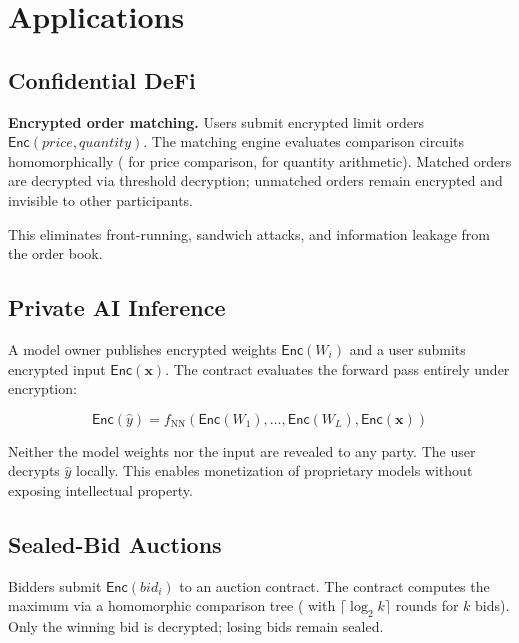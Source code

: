 \section{Applications}

\label{sec:apps}

\subsection{Confidential DeFi}

\textbf{Encrypted order matching.} Users submit encrypted limit orders $\mathsf{Enc}(\mathit{price}, \mathit{quantity})$. The matching engine evaluates comparison circuits homomorphically (\TFHE{} for price comparison, \CKKS{} for quantity arithmetic). Matched orders are decrypted via threshold decryption; unmatched orders remain encrypted and invisible to other participants.

This eliminates front-running, sandwich attacks, and information leakage from the order book.

\subsection{Private AI Inference}

A model owner publishes encrypted weights $\mathsf{Enc}(W_i)$ and a user submits encrypted input $\mathsf{Enc}(\mathbf{x})$. The contract evaluates the forward pass entirely under \CKKS{} encryption:

\begin{equation}
  \mathsf{Enc}(\hat{y}) = f_{\mathrm{NN}}(\mathsf{Enc}(W_1), \ldots, \mathsf{Enc}(W_L), \mathsf{Enc}(\mathbf{x}))
\end{equation}

Neither the model weights nor the input are revealed to any party. The user decrypts $\hat{y}$ locally. This enables monetization of proprietary models without exposing intellectual property.

\subsection{Sealed-Bid Auctions}

Bidders submit $\mathsf{Enc}(\mathit{bid}_i)$ to an auction contract. The contract computes the maximum via a homomorphic comparison tree (\TFHE{} with $\lceil \log_2 k \rceil$ rounds for $k$ bids). Only the winning bid is decrypted; losing bids remain sealed.

